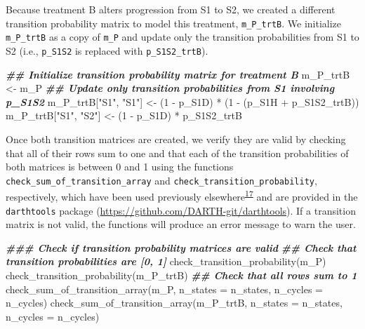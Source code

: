 \documentclass[
]{article}
\newenvironment{Shaded}{\begin{snugshade}}{\end{snugshade}}
\newcommand{\AttributeTok}[1]{\textcolor[rgb]{0.77,0.63,0.00}{#1}}
\newcommand{\DecValTok}[1]{\textcolor[rgb]{0.00,0.00,0.81}{#1}}
\newcommand{\DocumentationTok}[1]{\textcolor[rgb]{0.56,0.35,0.01}{\textbf{\textit{#1}}}}
\newcommand{\FunctionTok}[1]{\textcolor[rgb]{0.00,0.00,0.00}{#1}}
\newcommand{\NormalTok}[1]{#1}
\newcommand{\OtherTok}[1]{\textcolor[rgb]{0.56,0.35,0.01}{#1}}
\newcommand{\SpecialCharTok}[1]{\textcolor[rgb]{0.00,0.00,0.00}{#1}}
\newcommand{\StringTok}[1]{\textcolor[rgb]{0.31,0.60,0.02}{#1}}
\begin{document}
Because treatment B alters progression from S1 to S2, we created a different transition probability matrix to model this treatment, \texttt{m\_P\_trtB}. We initialize \texttt{m\_P\_trtB} as a copy of \texttt{m\_P} and update only the transition probabilities from S1 to S2 (i.e., \texttt{p\_S1S2} is replaced with \texttt{p\_S1S2\_trtB}).

\begin{Shaded}
\begin{Highlighting}[]
\DocumentationTok{\#\# Initialize transition probability matrix for treatment B}
\NormalTok{m\_P\_trtB }\OtherTok{\textless{}{-}}\NormalTok{ m\_P}
\DocumentationTok{\#\# Update only transition probabilities from S1 involving p\_S1S2}
\NormalTok{m\_P\_trtB[}\StringTok{"S1"}\NormalTok{, }\StringTok{"S1"}\NormalTok{] }\OtherTok{\textless{}{-}}\NormalTok{ (}\DecValTok{1} \SpecialCharTok{{-}}\NormalTok{ p\_S1D) }\SpecialCharTok{*}\NormalTok{ (}\DecValTok{1} \SpecialCharTok{{-}}\NormalTok{ (p\_S1H }\SpecialCharTok{+}\NormalTok{ p\_S1S2\_trtB))}
\NormalTok{m\_P\_trtB[}\StringTok{"S1"}\NormalTok{, }\StringTok{"S2"}\NormalTok{] }\OtherTok{\textless{}{-}}\NormalTok{ (}\DecValTok{1} \SpecialCharTok{{-}}\NormalTok{ p\_S1D) }\SpecialCharTok{*}\NormalTok{ p\_S1S2\_trtB}
\end{Highlighting}
\end{Shaded}

Once both transition matrices are created, we verify they are valid by checking that all of their rows sum to one and that each of the transition probabilities of both matrices is between 0 and 1 using the functions \texttt{check\_sum\_of\_transition\_array} and \texttt{check\_transition\_probability}, respectively, which have been used previously elsewhere\textsuperscript{\protect\hyperlink{ref-Alarid-Escudero2019e}{17}} and are provided in the \texttt{darthtools} package (\url{https://github.com/DARTH-git/darthtools}). If a transition matrix is not valid, the functions will produce an error message to warn the user.

\begin{Shaded}
\begin{Highlighting}[]
\DocumentationTok{\#\#\# Check if transition probability matrices are valid}
\DocumentationTok{\#\# Check that transition probabilities are [0, 1]}
\FunctionTok{check\_transition\_probability}\NormalTok{(m\_P)}
\FunctionTok{check\_transition\_probability}\NormalTok{(m\_P\_trtB)}
\DocumentationTok{\#\# Check that all rows sum to 1}
\FunctionTok{check\_sum\_of\_transition\_array}\NormalTok{(m\_P,      }\AttributeTok{n\_states =}\NormalTok{ n\_states, }\AttributeTok{n\_cycles =}\NormalTok{ n\_cycles)}
\FunctionTok{check\_sum\_of\_transition\_array}\NormalTok{(m\_P\_trtB, }\AttributeTok{n\_states =}\NormalTok{ n\_states, }\AttributeTok{n\_cycles =}\NormalTok{ n\_cycles)}
\end{Highlighting}
\end{Shaded}
\end{document}
